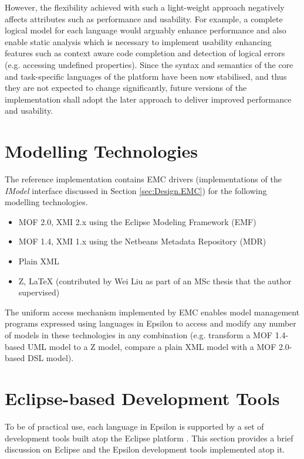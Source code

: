 However, the flexibility achieved with such a light-weight approach negatively affects attributes such as performance and usability. For example, a complete logical model for each language would arguably enhance performance and also enable static analysis which is necessary to implement usability enhancing features such as context aware code completion and detection of logical errors (e.g. accessing undefined properties). Since the syntax and semantics of the core and task-specific languages of the platform have been now stabilised, and thus they are not expected to change significantly, future versions of the implementation shall adopt the later approach to deliver improved performance and usability.

\section{Modelling Technologies}
\label{sec:Implementation.ModellingTechnologies}
The reference implementation contains EMC drivers (implementations of the \emph{IModel} interface discussed in Section \ref{sec:Design.EMC}) for the following modelling technologies. 

\begin{itemize}
	\item MOF 2.0, XMI 2.x using the Eclipse Modeling Framework (EMF)
	\item MOF 1.4, XMI 1.x using the Netbeans Metadata Repository (MDR)
	\item Plain XML
	\item Z, LaTeX (contributed by Wei Liu as part of an MSc thesis \cite{WeiLiu} that the author supervised)
\end{itemize}

The uniform access mechanism implemented by EMC enables model management programs expressed using languages in Epsilon to access and modify any number of models in these technologies in any combination (e.g. transform a MOF 1.4-based UML model to a Z model, compare a plain XML model with a MOF 2.0-based DSL model).

\section{Eclipse-based Development Tools}
\label{sec:Implementation.DevelopmentTools}
To be of practical use, each language in Epsilon is supported by a set of development tools built atop the Eclipse platform \cite{Eclipse}. This section provides a brief discussion on Eclipse and the Epsilon development tools implemented atop it. 

